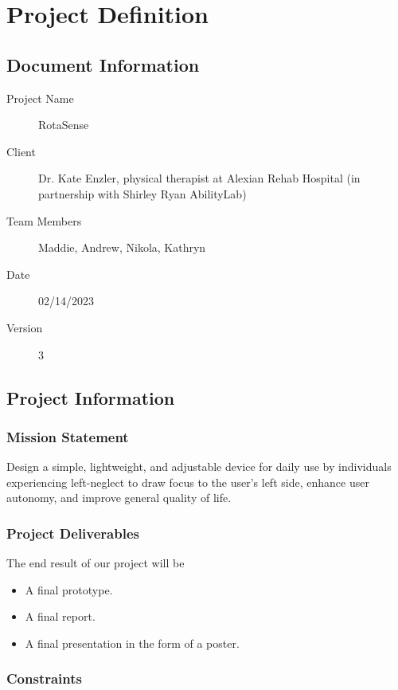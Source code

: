 \chapter{Project Definition}
\label{chap:project_def}

\section{Document Information}

\begin{description}
\item[Project Name] RotaSense
\item[Client] Dr. Kate Enzler, physical therapist at Alexian Rehab Hospital (in
  partnership with Shirley Ryan AbilityLab)
\item[Team Members] Maddie, Andrew, Nikola, Kathryn
\item[Date] 02/14/2023
\item[Version] 3
\end{description}

\section{Project Information}

\subsection{Mission Statement}

Design a simple, lightweight, and adjustable device for daily use by
individuals experiencing left-neglect to draw focus to the user’s left side,
enhance user autonomy, and improve general quality of life. 

\subsection{Project Deliverables}

The end result of our project will be

\begin{itemize}
\item A final prototype.
\item A final report.
\item A final presentation in the form of a poster.
\end{itemize}

\subsection{Constraints}

